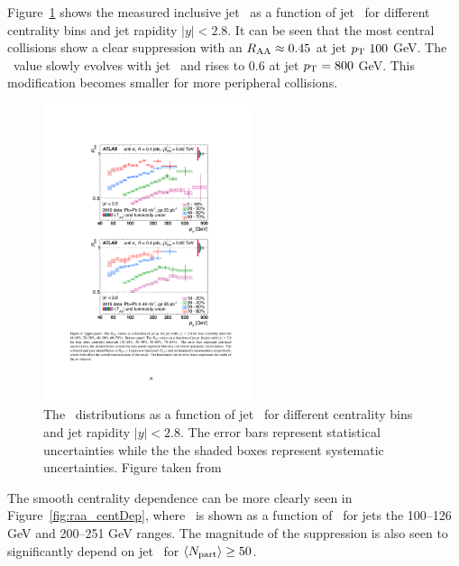 Figure~\ref{fig:raa} shows the measured inclusive jet \RAA\ as a function of jet \pt\ for different centrality bins and jet rapidity $|y| < 2.8$. It can be seen that the most central collisions show a clear suppression with an $\mbox{$R_{\rm AA}$} \approx 0.45$ at jet $\mbox{$p_{\mathrm{T}}$}\ 100$ GeV. The \RAA\ value slowly evolves with jet \pt\ and rises to 0.6 at jet $\mbox{$p_{\mathrm{T}}$} = 800$ GeV. This modification becomes smaller for more peripheral collisions. 

\begin{figure}[htbp]
\begin{center}
\includegraphics[width=0.55\textwidth]{figures/jetMeasurements/raa}
\caption{The \RAA\ distributions as a function of jet \pt\ for different centrality bins and jet rapidity $|y| < 2.8$. The error bars represent statistical uncertainties while the the shaded boxes represent systematic uncertainties. Figure taken from \cite{2019108}}
\label{fig:raa}
\end{center}
\end{figure}

The smooth centrality dependence can be more clearly seen in Figure~\ref{fig:raa_centDep}, where \RAA\ is shown as a function of \ANpart\ for jets the 100--126 GeV and 200--251 GeV ranges. The magnitude of the suppression is also seen to significantly depend on jet \pt\ for $\mbox{$\langle N_{\mathrm{part}}\rangle$} \geq 50$. 


